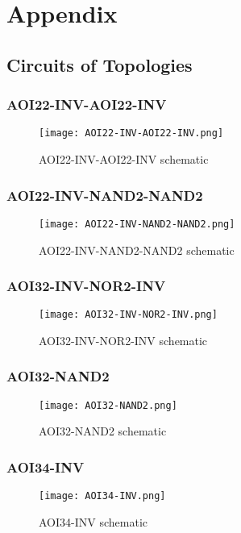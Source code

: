 \documentclass[conference]{IEEEtran}
\begin{document}
\section{Appendix} 

\subsection{Circuits of Topologies}
\subsubsection{AOI22-INV-AOI22-INV}\hspace{1mm}
  \begin{figure}[H]
  \center
  \texttt{[image: AOI22-INV-AOI22-INV.png]}
  \caption{AOI22-INV-AOI22-INV schematic}
  \end{figure}

\subsubsection{AOI22-INV-NAND2-NAND2}\hspace{1mm}
  \begin{figure}[H]
  \center
  \texttt{[image: AOI22-INV-NAND2-NAND2.png]}
  \caption{AOI22-INV-NAND2-NAND2 schematic}
  \end{figure}

\subsubsection{AOI32-INV-NOR2-INV}\hspace{1mm}
\begin{figure}[H]
\center
\texttt{[image: AOI32-INV-NOR2-INV.png]}
\caption{AOI32-INV-NOR2-INV schematic}
\end{figure}

\subsubsection{AOI32-NAND2}\hspace{1mm}
\begin{figure}[H]
\center
\texttt{[image: AOI32-NAND2.png]}
\caption{AOI32-NAND2 schematic}
\end{figure}

\subsubsection{AOI34-INV}\hspace{1mm}
\begin{figure}[H]
\center
\texttt{[image: AOI34-INV.png]}
\caption{AOI34-INV schematic}
\end{figure}
\end{document}
